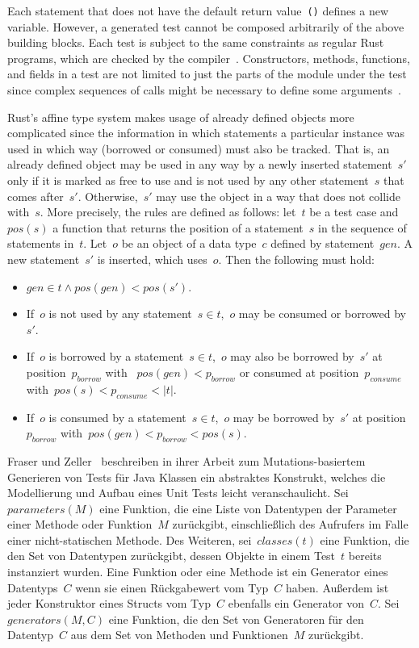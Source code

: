 \documentclass{article}
\begin{document}
Each statement that does not have the default return value~\lstinline{()} defines a new variable. However, a generated test cannot be composed arbitrarily of the above building blocks. Each test is subject to the same constraints as regular Rust programs, which are checked by the compiler~\cite{Tonella2004}. Constructors, methods, functions, and fields in a test are not limited to just the parts of the module under the test since complex sequences of calls might be necessary to define some arguments~\cite{Fraser2012}.

Rust's affine type system makes usage of already defined objects more complicated since the information in which statements a particular instance was used in which way (borrowed or consumed) must also be tracked. That is, an already defined object may be used in any way by a newly inserted statement~$s'$ only if it is marked as free to use and is not used by any other statement~$s$ that comes after~$s'$. Otherwise,~$s'$ may use the object in a way that does not collide with~$s$. More precisely, the rules are defined as follows: let~$t$ be a test case and $pos(s)$ a function that returns the position of a statement~$s$ in the sequence of statements in~$t$. Let~$o$ be an object of a data type~$c$ defined by statement~$gen$. A new statement~$s'$ is inserted, which uses~$o$. Then the following must hold:
\begin{itemize}
    \item $gen \in t \wedge pos(gen) < pos(s')$.
    \item If~$o$ is not used by any statement~$s \in t$,~$o$ may be consumed or borrowed by~$s'$.
    \item If~$o$ is borrowed by a statement~$s \in t$,~$o$ may also be borrowed by~$s'$ at position~$p_{borrow}$ with ~$pos(gen) < p_{borrow}$ or consumed at position~$p_{consume}$ with~$pos(s) < p_{consume} < \left|t\right|$.
    \item If~$o$ is consumed by a statement~$s \in t$,~$o$ may be borrowed by~$s'$ at position~$p_{borrow}$ with~$pos(gen) < p_{borrow} < pos(s)$.
\end{itemize}

Fraser und Zeller~\cite{Fraser2012} beschreiben in ihrer Arbeit zum Mutations-basiertem Generieren von Tests für Java Klassen ein abstraktes Konstrukt, welches die Modellierung und Aufbau eines Unit Tests leicht veranschaulicht. Sei~$parameters(M)$ eine Funktion, die eine Liste von Datentypen der Parameter einer Methode oder Funktion~$M$ zurückgibt, einschließlich des Aufrufers im Falle einer nicht-statischen Methode. Des Weiteren, sei~$classes(t)$ eine Funktion, die den Set von Datentypen zurückgibt, dessen Objekte in einem Test~$t$ bereits instanziert wurden. Eine Funktion oder eine Methode ist ein Generator eines Datentyps~$C$ wenn sie einen Rückgabewert vom Typ~$C$ haben. Außerdem ist jeder Konstruktor eines Structs vom Typ~$C$ ebenfalls ein Generator von~$C$. Sei~$generators(M,C)$ eine Funktion, die den Set von Generatoren für den Datentyp~$C$ aus dem Set von Methoden und Funktionen~$M$ zurückgibt.
\end{document}
